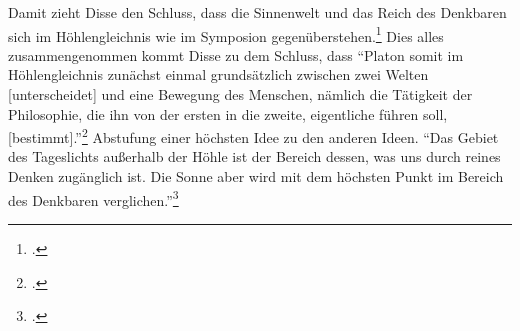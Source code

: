 Damit zieht Disse den Schluss, dass die Sinnenwelt und das Reich des Denkbaren sich im Höhlengleichnis wie im Symposion gegenüberstehen.\footcite[vgl.][S. 28]{DisseMetaphysik}
Dies alles zusammengenommen kommt Disse zu dem Schluss, dass \enquote{Platon somit im Höhlengleichnis zunächst einmal grundsätzlich zwischen zwei Welten [unterscheidet] und eine Bewegung des Menschen, nämlich die Tätigkeit der Philosophie, die ihn von der ersten in die zweite, eigentliche führen soll, [bestimmt].}\footcite[vgl.][S. 23f.]{DisseMetaphysik}
Abstufung einer höchsten Idee zu den anderen Ideen.
\enquote{Das Gebiet des Tageslichts außerhalb der Höhle ist der Bereich dessen, was uns durch reines Denken zugänglich ist. Die Sonne aber wird mit dem höchsten Punkt im Bereich des Denkbaren verglichen.}\footcite[][S. 49]{DisseMetaphysik}

